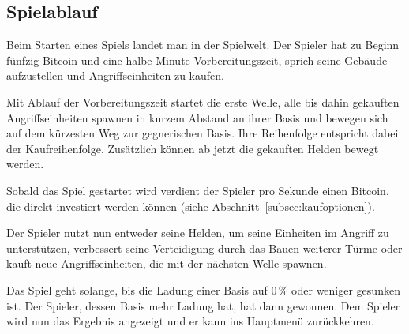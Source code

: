 \subsection{Spielablauf}

Beim Starten eines Spiels landet man in der Spielwelt. Der Spieler hat zu
Beginn fünfzig Bitcoin und eine halbe Minute Vorbereitungszeit, sprich seine
Gebäude aufzustellen und Angriffseinheiten zu kaufen.

Mit Ablauf der Vorbereitungszeit startet die erste Welle, alle bis dahin
gekauften Angriffseinheiten spawnen in kurzem Abstand an ihrer Basis und
bewegen sich auf dem kürzesten Weg zur gegnerischen Basis. Ihre Reihenfolge
entspricht dabei der Kaufreihenfolge. Zusätzlich können ab jetzt die gekauften
Helden bewegt werden.

Sobald das Spiel gestartet wird verdient der Spieler pro Sekunde einen Bitcoin,
die direkt investiert werden können (siehe
Abschnitt~\ref{subsec:kaufoptionen}).

Der Spieler nutzt nun entweder seine Helden, um seine Einheiten im Angriff zu
unterstützen, verbessert seine Verteidigung durch das Bauen weiterer Türme oder
kauft neue Angriffseinheiten, die mit der nächsten Welle spawnen.

Das Spiel geht solange, bis die Ladung einer Basis auf 0\,\% oder weniger
gesunken ist. Der Spieler, dessen Basis mehr Ladung hat, hat dann gewonnen. Dem
Spieler wird nun das Ergebnis angezeigt und er kann ins Hauptmenü zurückkehren.
